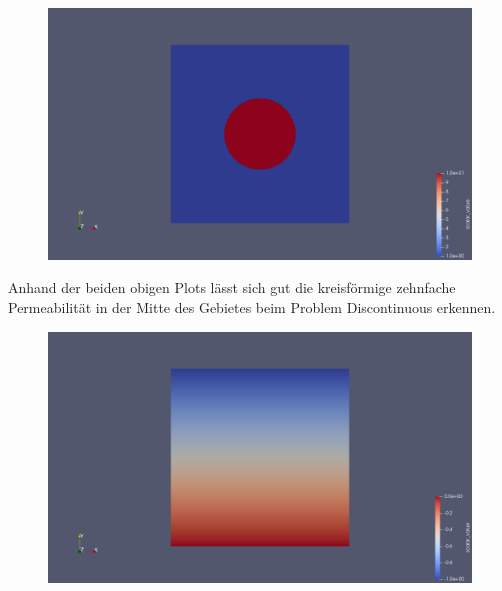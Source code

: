 \documentclass[12pt,a4paper]{scrartcl}
\numberwithin{equation}{section}
\begin{document}
\begin{enumerate}[label=(\roman*)]
\begin{figure}[H]
	\centering
		\includegraphics[width=\textwidth]{../Problem_DiscontinousMesh_UnitSquarelevel_8/perm.png}
\end{figure}
Anhand der beiden obigen Plots lässt sich gut die kreisförmige zehnfache Permeabilität in der Mitte des Gebietes beim Problem Discontinuous erkennen. 
\newline

\begin{figure}[H]
	\centering
 		\includegraphics[width=\textwidth]{../Problem_SimpleMesh_UnitSquarelevel_8/u.png} 
\end{figure}


\end{enumerate}
\end{document}
